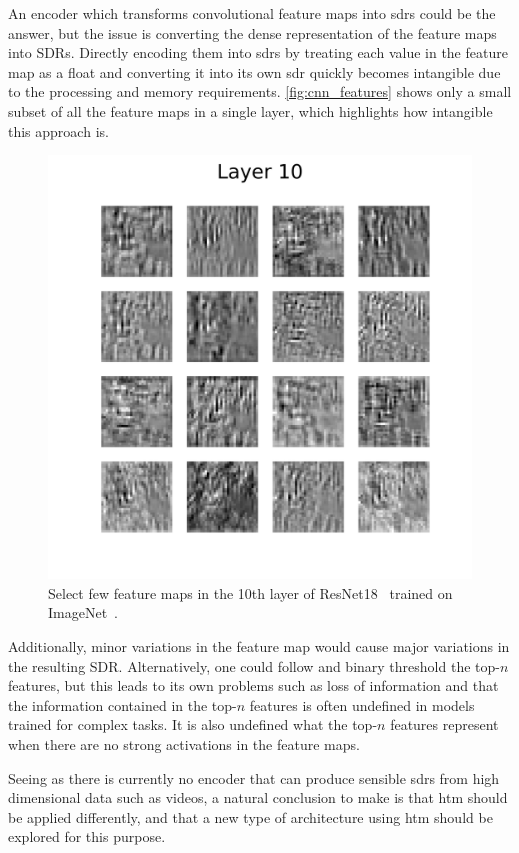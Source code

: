 \par
An encoder which transforms convolutional feature maps into \glspl*{sdr} could be the answer, but the issue is converting the dense representation of the feature maps into SDRs. Directly encoding them into \glspl*{sdr} by treating each value in the feature map as a float and converting it into its own \gls*{sdr} quickly becomes intangible due to the processing and memory requirements. \autoref{fig:cnn_features} shows only a small subset of all the feature maps in a single layer, which highlights how intangible this approach is.
\begin{figure}[htb]
    \centering
    \includegraphics[width=0.5\linewidth]{resources/related_works/resnet18_layer_10.png}
    \caption[Feature Maps]{Select few feature maps in the 10th layer of ResNet18~\cite{resnet} trained on ImageNet~\cite{imagenet}.}
    \label{fig:cnn_features}
\end{figure}
\par
Additionally, minor variations in the feature map would cause major variations in the resulting SDR. Alternatively, one could follow \textcite{CNN_HTM} and binary threshold the top-$n$ features, but this leads to its own problems such as loss of information and that the information contained in the top-$n$ features is often undefined in models trained for complex tasks. It is also undefined what the top-$n$ features represent when there are no strong activations in the feature maps.
\par
Seeing as there is currently no encoder that can produce sensible \glspl*{sdr} from high dimensional data such as videos, a natural conclusion to make is that \gls*{htm} should be applied differently, and that a new type of architecture using \gls*{htm} should be explored for this purpose.
